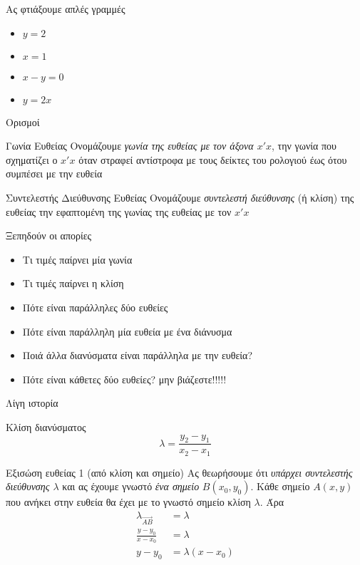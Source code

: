\documentclass[greek]{beamer}
\begin{document}
\begin{frame}{Ας φτιάξουμε απλές γραμμές}
  \begin{itemize}[<+->]
    \item $y=2$
    \item $x=1$
    \item $x-y=0$
    \item $y=2x$
  \end{itemize}
\end{frame}

\begin{frame}{Ορισμοί}
  \begin{block}{Γωνία Ευθείας}
    Ονομάζουμε \emph{γωνία της ευθείας με τον άξονα $x'x$}, την γωνία που σχηματίζει ο $x'x$ όταν στραφεί αντίστροφα με τους δείκτες του ρολογιού έως ότου συμπέσει με την ευθεία
  \end{block}
  \begin{block}{Συντελεστής Διεύθυνσης Ευθείας}
    Ονομάζουμε \emph{συντελεστή διεύθυνσης} (ή κλίση) της ευθείας την εφαπτομένη της γωνίας της ευθείας με τον $x'x$
  \end{block}
\end{frame}

\begin{frame}{Ξεπηδούν οι απορίες}
  \begin{itemize}[<+->]
    \item Τι τιμές παίρνει μία γωνία
    \item Τι τιμές παίρνει η κλίση
    \item Πότε είναι παράλληλες δύο ευθείες
    \item Πότε είναι παράλληλη μία ευθεία με ένα διάνυσμα
    \item Ποιά άλλα διανύσματα είναι παράλληλα με την ευθεία?
    \item Πότε είναι κάθετες δύο ευθείες? μην βιάζεστε!!!!!
  \end{itemize}
\end{frame}

\begin{frame}{Λίγη ιστορία}
  \begin{block}{Κλίση διανύσματος}
    $$λ=\frac{y_2-y_1}{x_2-x_1}$$
  \end{block}
\end{frame}

\begin{frame}{Εξισώση ευθείας 1 (από κλίση και σημείο)}
  Ας θεωρήσουμε ότι \emph{υπάρχει συντελεστής διεύθυνσης $λ$} και ας έχουμε γνωστό \emph{ένα σημείο} $B(x_0,y_0)$. Κάθε σημείο $A(x,y)$ που ανήκει στην ευθεία θα έχει με το γνωστό σημείο κλίση $λ$. Άρα
  \begin{align*}
    λ_{\overrightarrow{AB}} & =λ        \\
    \frac{y-y_0}{x-x_0}     & =λ        \\
    y-y_0                   & =λ(x-x_0)
  \end{align*}
\end{frame}
\end{document}
